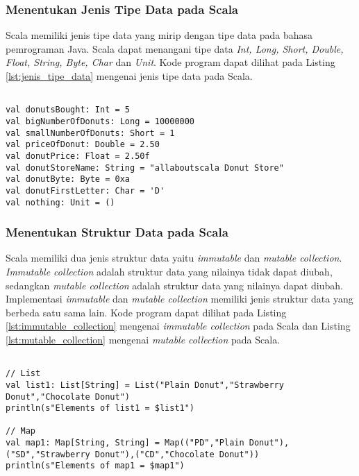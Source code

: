 \subsubsection{Menentukan Jenis Tipe Data pada Scala}
Scala memiliki jenis tipe data yang mirip dengan tipe data pada bahasa pemrograman Java. Scala dapat menangani tipe data \textit{Int, Long, Short, Double, Float, String, Byte, Char} dan \textit{Unit}. Kode program dapat dilihat pada Listing \ref{lst:jenis_tipe_data} mengenai jenis tipe data pada Scala.

\begin{lstlisting}[basicstyle=\ttfamily, frame=single,
	columns=fullflexible, keepspaces=true, breaklines=true, label=lst:jenis_tipe_data, caption=Menentukan Jenis Tipe Data pada Scala]
	
val donutsBought: Int = 5
val bigNumberOfDonuts: Long = 10000000
val smallNumberOfDonuts: Short = 1
val priceOfDonut: Double = 2.50
val donutPrice: Float = 2.50f
val donutStoreName: String = "allaboutscala Donut Store"
val donutByte: Byte = 0xa
val donutFirstLetter: Char = 'D'
val nothing: Unit = ()

\end{lstlisting}

\newpage
\subsubsection{Menentukan Struktur Data pada Scala}
Scala memiliki dua jenis struktur data yaitu \textit{immutable} dan \textit{mutable collection}. \textit{Immutable collection} adalah struktur data yang nilainya tidak dapat diubah, sedangkan \textit{mutable collection} adalah struktur data yang nilainya dapat diubah. Implementasi \textit{immutable} dan \textit{mutable collection} memiliki jenis struktur data yang berbeda satu sama lain. Kode program dapat dilihat pada Listing \ref{lst:immutable_collection} mengenai \textit{immutable collection} pada Scala dan Listing \ref{lst:mutable_collection} mengenai \textit{mutable collection} pada Scala.

\begin{lstlisting}[basicstyle=\ttfamily, frame=single,
	columns=fullflexible, keepspaces=true, breaklines=true, label=lst:immutable_collection, caption=Membuat immutable collection pada Scala]
	
// List
val list1: List[String] = List("Plain Donut","Strawberry Donut","Chocolate Donut")
println(s"Elements of list1 = $list1")

// Map
val map1: Map[String, String] = Map(("PD","Plain Donut"),("SD","Strawberry Donut"),("CD","Chocolate Donut"))
println(s"Elements of map1 = $map1")

\end{lstlisting}

